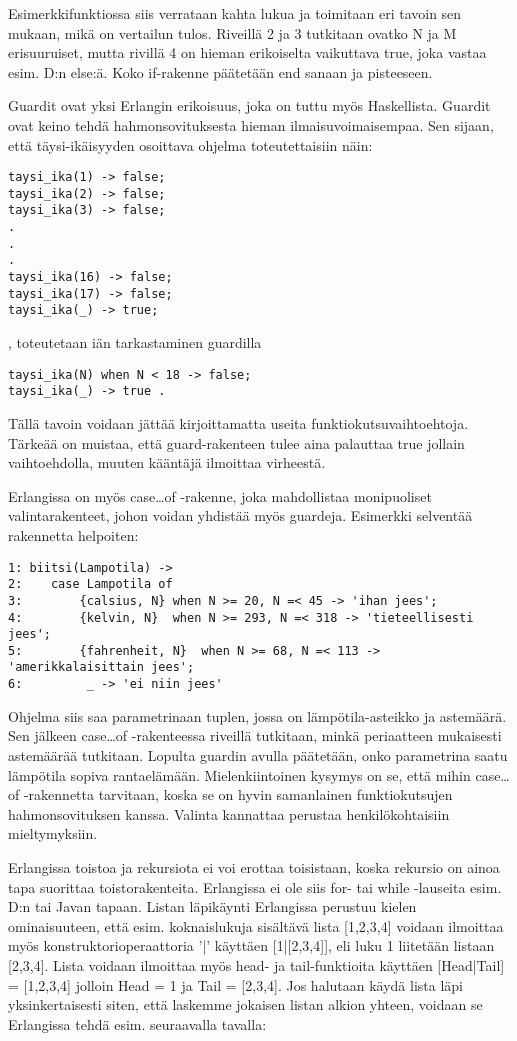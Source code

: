 \documentclass[11pt,oneside,a4paper]{article}
\begin{document}
Esimerkkifunktiossa siis verrataan kahta lukua ja toimitaan eri tavoin sen
mukaan, mikä on vertailun tulos. Riveillä 2 ja 3 tutkitaan ovatko N ja M
erisuuruiset, mutta rivillä 4 on hieman erikoiselta
vaikuttava true, joka vastaa esim. D:n else:ä. Koko if-rakenne päätetään end
sanaan ja pisteeseen. 

Guardit ovat yksi Erlangin erikoisuus, joka on tuttu myös Haskellista. Guardit
ovat keino tehdä hahmonsovituksesta hieman ilmaisuvoimaisempaa. Sen sijaan, että
täysi-ikäisyyden osoittava ohjelma 
toteutettaisiin näin: 
\begin{verbatim}
taysi_ika(1) -> false;
taysi_ika(2) -> false;
taysi_ika(3) -> false;
.
.
.
taysi_ika(16) -> false;
taysi_ika(17) -> false;
taysi_ika(_) -> true;
\end{verbatim}
, toteutetaan iän tarkastaminen guardilla
\begin{verbatim}
taysi_ika(N) when N < 18 -> false;
taysi_ika(_) -> true . 
\end{verbatim}

Tällä tavoin voidaan jättää kirjoittamatta useita funktiokutsuvaihtoehtoja. 
Tärkeää on muistaa, että guard-rakenteen tulee aina palauttaa true jollain
vaihtoehdolla, muuten kääntäjä ilmoittaa virheestä.  

Erlangissa on myös case…of -rakenne, joka mahdollistaa monipuoliset
valintarakenteet, johon voidan yhdistää myös guardeja. Esimerkki selventää
rakennetta helpoiten:
\begin{verbatim}
1: biitsi(Lampotila) -> 
2:    case Lampotila of
3:        {calsius, N} when N >= 20, N =< 45 -> 'ihan jees';
4:        {kelvin, N}  when N >= 293, N =< 318 -> 'tieteellisesti jees';  
5:        {fahrenheit, N}  when N >= 68, N =< 113 -> 'amerikkalaisittain jees'; 
6:         _ -> 'ei niin jees' 
\end{verbatim}

Ohjelma siis saa parametrinaan tuplen, jossa on lämpötila-asteikko ja astemäärä.
Sen jälkeen case…of -rakenteessa riveillä  tutkitaan, minkä periaatteen
mukaisesti astemäärää tutkitaan. Lopulta guardin avulla päätetään, onko
parametrina 
saatu lämpötila sopiva rantaelämään. Mielenkiintoinen kysymys on se, että mihin
case…of -rakennetta tarvitaan, koska se on hyvin samanlainen funktiokutsujen
hahmonsovituksen kanssa. Valinta kannattaa perustaa henkilökohtaisiin
mieltymyksiin. 

Erlangissa toistoa ja rekursiota ei voi erottaa toisistaan, koska rekursio on
ainoa tapa suorittaa toistorakenteita. Erlangissa ei ole siis for- tai while
-lauseita esim. D:n tai Javan tapaan. Listan läpikäynti Erlangissa perustuu
kielen ominaisuuteen, että
esim. koknaislukuja sisältävä lista [1,2,3,4]  voidaan ilmoittaa myös
konstruktorioperaattoria '|' käyttäen [1|[2,3,4]], eli luku 1 liitetään listaan
[2,3,4]. Lista voidaan ilmoittaa myös head- ja tail-funktioita käyttäen
[Head|Tail] = [1,2,3,4] jolloin Head = 1 ja Tail = [2,3,4].
Jos halutaan käydä lista läpi yksinkertaisesti siten, että laskemme jokaisen
listan alkion yhteen, voidaan se Erlangissa tehdä esim. seuraavalla tavalla:
\end{document}
